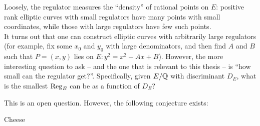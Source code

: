 \documentclass[10pt]{article}
\begin{document}
Loosely, the regulator measures the ``density'' of rational points on $E$: positive rank elliptic curves with small regulators have many points with small coordinates, while those with large regulators have few such points. \\

It turns out that one can construct elliptic curves with arbitrarily large regulators (for example, fix some $x_0$ and $y_0$ with large denominators, and then find $A$ and $B$ such that $P=(x,y)$ lies on $E: y^2 = x^2 + Ax + B$). However, the more interesting question to ask -- and the one that is relevant to this thesis -- is ``how small can the regulator get?''. Specifically, given $E/\mathbb{Q}$ with discriminant $D_E$, what is the smallest $\operatorname{Reg}_E$ can be as a function of $D_E$?

This is an open question. However, the following conjecture exists:

\begin{conjecture}[Lang]
Cheese
\end{conjecture}





{}

\end{document}
